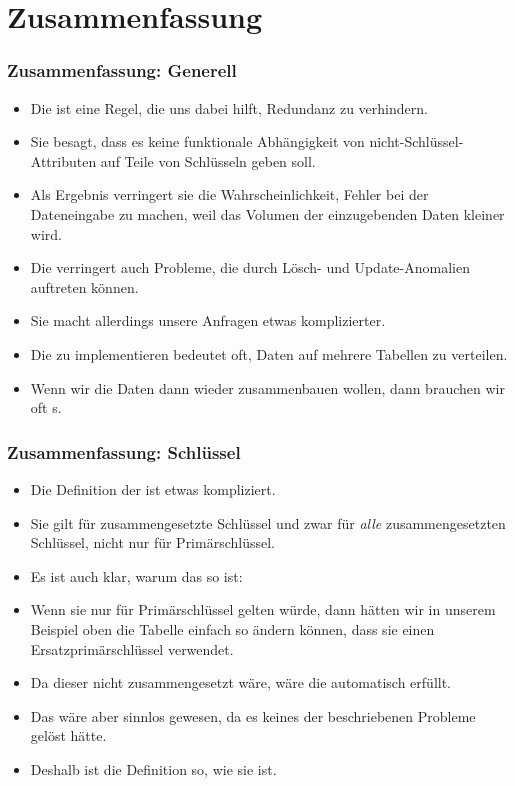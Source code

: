 \documentclass[aspectratio=169,mathserif,notheorems]{beamer}%
\begin{document}
\section{Zusammenfassung}%
%
\begin{frame}%
\frametitle{Zusammenfassung: Generell}%
\begin{itemize}%
%
\item Die  ist eine Regel, die uns dabei hilft, Redundanz zu verhindern.%
%
\item<2-> Sie besagt, dass es keine funktionale Abhängigkeit von nicht-Schlüssel-Attributen auf Teile von Schlüsseln geben soll.%
%
\item<3-> Als Ergebnis verringert sie die Wahrscheinlichkeit, Fehler bei der Dateneingabe zu machen, weil das Volumen der einzugebenden Daten kleiner wird.%
%
\item<4-> Die  verringert auch Probleme, die durch Lösch- und Update-Anomalien auftreten können.%
%
\item<5-> Sie macht allerdings unsere Anfragen etwas komplizierter.%
%
\item<6-> Die  zu implementieren bedeutet oft, Daten auf mehrere Tabellen zu verteilen.%
%
\item<7-> Wenn wir die Daten dann wieder zusammenbauen wollen, dann brauchen wir oft s.%
\end{itemize}%
\end{frame}%
%
\begin{frame}%
\frametitle{Zusammenfassung: Schlüssel}%
\begin{itemize}%
%
\item Die Definition der  ist etwas kompliziert.%
%
\item<2-> Sie gilt für zusammengesetzte Schlüssel und zwar für \emph{alle} zusammengesetzten Schlüssel, nicht nur für Primärschlüssel.%
%
\item<3-> Es ist auch klar, warum das so ist:%
%
\item<4-> Wenn sie nur für Primärschlüssel gelten würde, dann hätten wir in unserem Beispiel oben die Tabelle  einfach so ändern können, dass sie einen Ersatzprimärschlüssel verwendet.%
%
\item<5-> Da dieser nicht zusammengesetzt wäre, wäre die  automatisch erfüllt.%
%
\item<6-> Das wäre aber sinnlos gewesen, da es keines der beschriebenen Probleme gelöst hätte.%
%
\item<7-> Deshalb ist die Definition so, wie sie ist.%
\end{itemize}%
\end{frame}%
\endPresentation%
\end{document}
